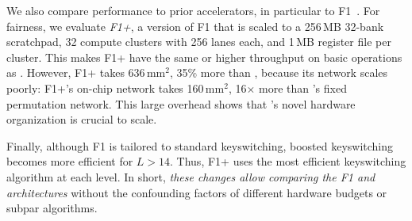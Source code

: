 We also compare performance to prior accelerators, in particular to
F1~\cite{feldmann:micro21:f1}. For fairness, we evaluate \emph{F1+}, a version
of F1 that is scaled to a 256\,MB 32-bank scratchpad, 32 compute clusters with
256 lanes each, and 1\,MB register file per cluster. This makes F1+ have the
same or higher throughput on basic operations as \name. However, F1+ takes
636\,mm$^2$, 35\% more than \name, because its network scales poorly: F1+'s
on-chip network takes 160\,mm$^2$, 16$\times$ more than \name's fixed
permutation network. This large overhead shows that \name's novel hardware
organization is crucial to scale.

Finally, although F1 is tailored to standard keyswitching, boosted keyswitching
becomes more efficient for $L>14$. Thus, F1+ uses the most efficient
keyswitching algorithm at each level. In short, \emph{these changes allow
comparing the F1 and \name architectures} without the confounding factors of
different hardware budgets or subpar algorithms.


